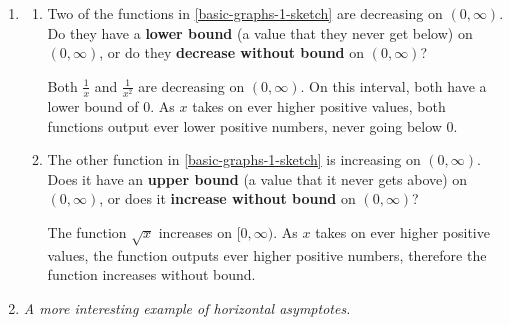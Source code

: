 \documentclass{article}
\begin{document}
\begin{enumerate}[resume]
\item  \label{bounded-vs-without-bound}
  \begin{enumerate}

  \item


    \begin{problem}[0.75in]
      Two of the functions in \ref{basic-graphs-1-sketch} are decreasing on $(0, \infty)$. Do they have a \textbf{lower bound} (a value that they never get below) on $(0, \infty)$, or do they \textbf{decrease without bound} on $(0, \infty)$?
    \end{problem}

    \begin{solution}
      Both $\frac{1}{x}$ and $\frac{1}{x^2}$ are decreasing on $(0,\infty)$. On this interval,
    both have a lower bound of $0$. As $x$ takes on ever higher positive values, 
      both functions output ever lower positive numbers, never going below 0.
    \end{solution}

  \item
    \begin{problem}[0.5in]
      The other function in \ref{basic-graphs-1-sketch} is increasing on $(0, \infty)$. Does it have an \textbf{upper bound} (a value that it never gets above) on $(0, \infty)$, or does it \textbf{increase without bound} on $(0, \infty)$?
    \end{problem}

    \begin{solution}
      The function $\sqrt{x}$ increases on $[0,\infty)$. As $x$ takes on ever higher positive
      values, the function outputs ever higher positive numbers, therefore the function increases
      without bound.
    \end{solution}

  \end{enumerate}

\item  \label{horizontal-asymptote-misconceptions}


  \emph{A more interesting example of horizontal asymptotes.}


\end{enumerate}
\end{document}
